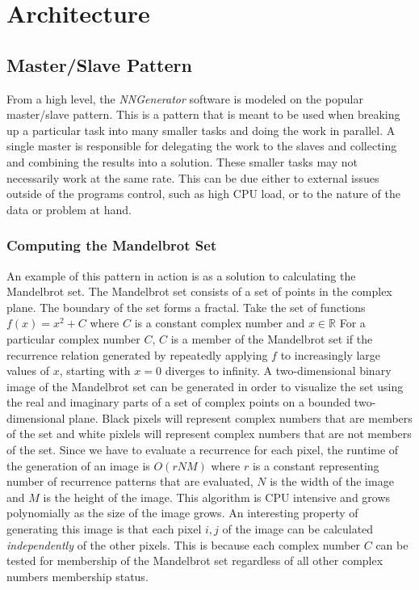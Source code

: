\chapter[Architecture]{Architecture}

\section{Master/Slave Pattern}
From a high level, the {\em NNGenerator} software is modeled on the popular master/slave pattern. 
This is a pattern that is meant to be used when breaking up a particular task into many smaller tasks and doing the work in parallel.
A single master is responsible for delegating the work to the slaves and collecting and combining the results into a solution.
These smaller tasks may not necessarily work at the same rate.
This can be due either to external issues outside of the programs control, such as high CPU load, or to the nature of the data or problem at hand.

\subsection{Computing the Mandelbrot Set}
An example of this pattern in action is as a solution to calculating the Mandelbrot set.
The Mandelbrot set consists of a set of points in the complex plane. The boundary of the set forms a fractal.
Take the set of functions $f(x)=x^2 + C$ where $C$ is a constant complex number and 
$x \in \mathbb{R}$
For a particular complex number $C$, $C$ is a member of the Mandelbrot set if
the recurrence relation generated by repeatedly applying $f$ to increasingly large values of $x$, starting with $x=0$ diverges to infinity. 
A two-dimensional binary image of the Mandelbrot set can be generated in order to visualize the set using the real and imaginary parts of a set of 
complex points on a bounded two-dimensional plane. 
Black pixels will represent complex numbers that are members of the set and white pixlels will represent complex numbers that are not members of the set.
Since we have to evaluate a recurrence for each pixel, the runtime of the generation of an image is $O(rNM)$ where $r$ is a constant representing number of recurrence patterns that are evaluated, $N$ is the width of the image and $M$ is the height of the image.
This algorithm is CPU intensive and grows polynomially as the size of the image grows. 
An interesting property of generating this image is that each pixel
$i,j$ of the image can be calculated {\it independently} of the other pixels.
This is because each complex number $C$ can be tested for membership of the Mandelbrot set regardless of all other complex numbers membership status.
 
